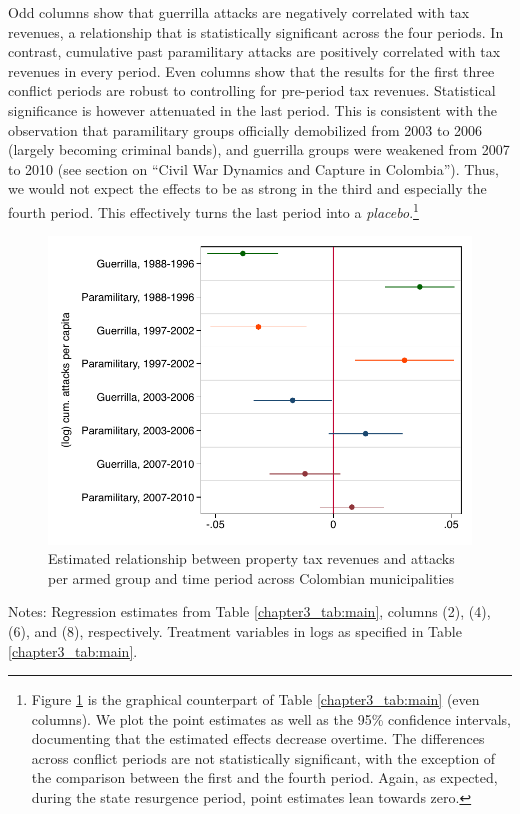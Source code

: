 Odd columns show that guerrilla attacks are negatively correlated with tax revenues, a relationship that is statistically significant across the four periods. In contrast, cumulative past paramilitary attacks are positively correlated with tax revenues in every period. Even columns show that the results for the first three conflict periods are robust to controlling for pre-period tax revenues. Statistical significance is however attenuated in the last period. This is consistent with the observation that paramilitary groups officially demobilized from 2003 to 2006 (largely becoming criminal bands), and guerrilla groups were weakened from 2007 to 2010 (see section on ``Civil War Dynamics and Capture in Colombia''). Thus, we would not expect the effects to be as strong in the third and especially the fourth period. This effectively turns the last period into a {\it placebo}.\footnote{Figure \ref{chapter3_fig:figure5} is the graphical counterpart of Table \ref{chapter3_tab:main} (even columns). We plot the point estimates as well as the 95\% confidence intervals, documenting that the estimated effects decrease overtime. The differences across conflict periods are not statistically significant, with the exception of the comparison between the first and the fourth period. Again, as expected, during the state resurgence period, point estimates lean towards zero.} 

\begin{figure}[H]
\begin{center}
\caption{Estimated relationship between property tax revenues and attacks per armed group and time period across Colombian municipalities}
\label{chapter3_fig:figure5}

\includegraphics[width=1\textwidth]{Chapter3/Figures/figure5.pdf}
\end{center}
\end{figure}
Notes: Regression estimates from Table \ref{chapter3_tab:main}, columns (2), (4), (6), and (8), respectively. Treatment variables in logs as specified in Table \ref{chapter3_tab:main}.  


